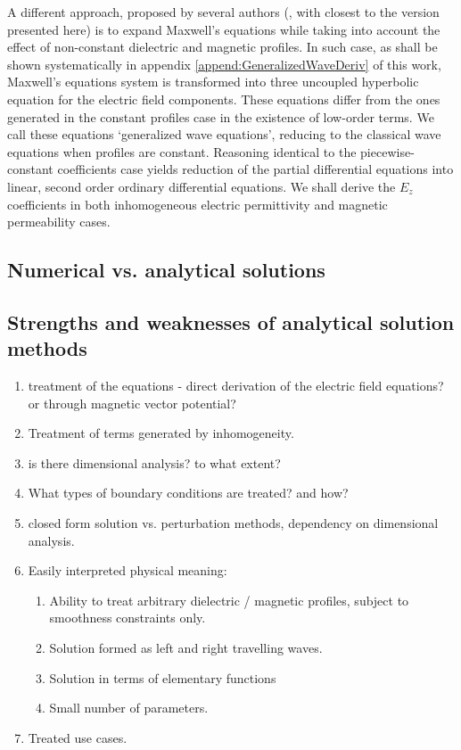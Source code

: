 \documentclass[twocolumn,secnumarabic,amssymb, nobibnotes, aps, prd]{revtex4-1}
\begin{document}
A different approach, proposed by several authors (\cite{Brekhovskikh1960,ishimaru1991electromagnetic}, with \cite{chew1995waves} closest to the version presented here) is to expand Maxwell's equations while taking into account the effect of non-constant dielectric and magnetic profiles. In such case, as shall be shown systematically in appendix \ref{append:GeneralizedWaveDeriv} of this work, Maxwell's equations system is transformed into three uncoupled hyperbolic equation for the electric field components. These equations differ from the ones generated in the constant profiles case in the existence of low-order terms. We call these equations `generalized wave equations', reducing to the classical wave equations when profiles are constant. Reasoning identical to the piecewise-constant coefficients case yields reduction of the partial differential equations into linear, second order ordinary differential equations. We shall derive the $E_z$ coefficients in both inhomogeneous electric permittivity and magnetic permeability cases.   
\\

\subsection{Numerical vs. analytical solutions}
\subsection{Strengths and weaknesses of analytical solution methods}
\begin{enumerate} 
\item treatment of the equations - direct derivation of the electric field equations? or through magnetic vector potential?
\item Treatment of terms generated by inhomogeneity.
\item is there dimensional analysis?  to what extent?
\item What types of boundary conditions are treated? and how?
\item closed form solution vs. perturbation methods, dependency on  dimensional analysis.
\item Easily interpreted physical meaning:
\begin{enumerate}
\item Ability to treat arbitrary dielectric / magnetic profiles, subject to smoothness constraints only.
\item Solution formed as left and right travelling waves.
\item Solution in  terms of elementary functions 
\item Small number of parameters. 
\end{enumerate} 
\item Treated use cases.
\end{enumerate}
\end{document}
